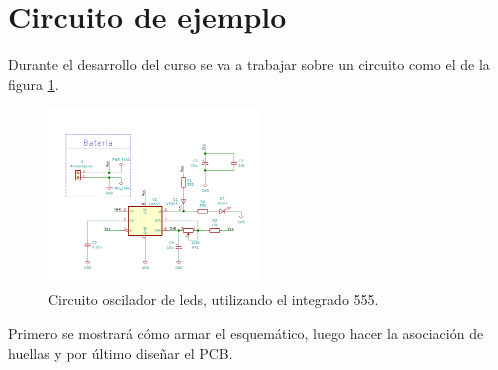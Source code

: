 \section{Circuito de ejemplo}

Durante el desarrollo del curso se va a trabajar sobre un circuito como el de la figura \ref{fig:circuito_ejemplo}.

\begin{figure}[H]
	\centering
	\includegraphics[width=0.5\textwidth]{imagenes/ejemplo_555.png}
	\caption{Circuito oscilador de leds, utilizando el integrado 555.}
	\label{fig:circuito_ejemplo}
\end{figure}

Primero se mostrará cómo armar el esquemático, luego hacer la asociación de huellas y por último diseñar el PCB.
